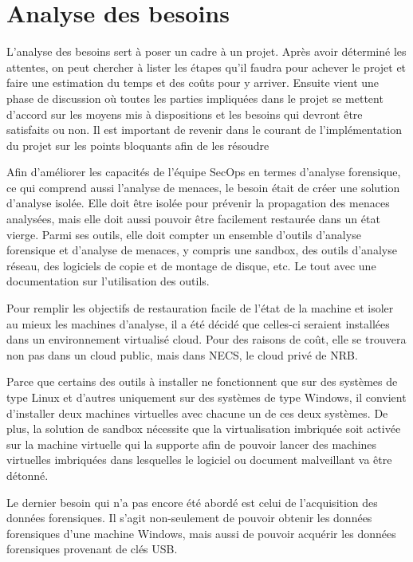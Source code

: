 
\chapter{Analyse des besoins}

L'analyse des besoins sert à poser un cadre à un projet. Après avoir déterminé les attentes, on peut chercher à lister les étapes qu'il faudra pour achever le projet et faire une estimation du temps et des coûts pour y arriver. Ensuite vient une phase de discussion où toutes les parties impliquées dans le projet se mettent d'accord sur les moyens mis à dispositions et les besoins qui devront être satisfaits ou non. Il est important de revenir dans le courant de l'implémentation du projet sur les points bloquants afin de les résoudre

Afin d'améliorer les capacités de l’équipe SecOps en termes d’analyse forensique, ce qui comprend aussi l’analyse de menaces, le besoin était de créer une solution d'analyse isolée. Elle doit être isolée pour prévenir la propagation des menaces analysées, mais elle doit aussi pouvoir être facilement restaurée dans un état vierge. Parmi ses outils, elle doit compter un ensemble d'outils d'analyse forensique et d'analyse de menaces, y compris une sandbox, des outils d'analyse réseau, des logiciels de copie et de montage de disque, etc. Le tout avec une documentation sur l'utilisation des outils.

Pour remplir les objectifs de restauration facile de l'état de la machine et isoler au mieux les machines d'analyse, il a été décidé que celles-ci seraient installées dans un environnement virtualisé cloud. Pour des raisons de coût, elle se trouvera non pas dans un cloud public, mais dans NECS, le cloud privé de NRB.

Parce que certains des outils à installer ne fonctionnent que sur des systèmes de type Linux et d'autres uniquement sur des systèmes de type Windows, il convient d'installer deux machines virtuelles avec chacune un de ces deux systèmes. De plus, la solution de sandbox nécessite que la virtualisation imbriquée soit activée sur la machine virtuelle qui la supporte afin de pouvoir lancer des machines virtuelles imbriquées dans lesquelles le logiciel ou document malveillant va être détonné.

Le dernier besoin qui n'a pas encore été abordé est celui de l'acquisition des données forensiques. Il s'agit non-seulement de pouvoir obtenir les données forensiques d'une machine Windows, mais aussi de pouvoir acquérir les données forensiques provenant de clés USB.


